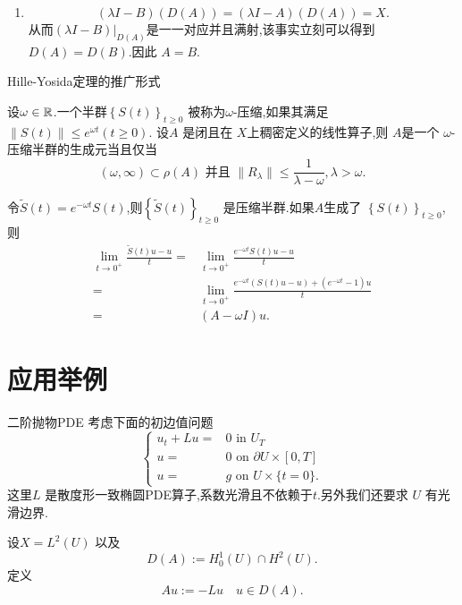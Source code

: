 \begin{frame}[t]
\begin{enumerate}
  \item []\[
      \left( \lambda I-B \right) (D(A))=\left( \lambda I-A \right) \left(D \left( A \right)  \right) =X.
  \] 
  从而$\left( \lambda I-B \right) |_{D(A)}$是一一对应并且满射,该事实立刻可以得到$D(A)=D(B)$.因此 $A=B$.
\end{enumerate}  
\end{frame}

\begin{frame}[t]{Hille-Yosida定理的推广形式}
  \begin{theorem}
    设$\omega \in \mathbb{R}$.一个半群$\left\{S(t)\right\} _{t\ge 0}$ 被称为$\omega$-压缩,如果其满足$\|S(t)\|\le e^{\omega t}(t\ge 0)$. 设$A$ 是闭且在 $X$上稠密定义的线性算子,则 $A$是一个 $\omega$-压缩半群的生成元当且仅当
    \begin{equation}
      (\omega,\infty)\subset \rho(A) \text{ 并且 } \|R_\lambda\|\le \frac{1}{\lambda - \omega},\lambda>\omega.\label{15}
    \end{equation}
  \end{theorem}
  令$\widetilde{S}(t)=e^{-\omega t}S(t)$,则$\left\{\widetilde{S}(t)\right\}_{t\ge 0} $ 是压缩半群.如果$A$生成了 $\left\{S(t)\right\} _{t\ge 0}$,则
  \begin{align*}
  \lim_{t\to 0^{+}}\frac{\widetilde{S}(t)u-u}{t}=&\lim_{t\to 0^{+}} \frac{e^{-\omega t }S(t)u - u}{t} \\
  = & \lim_{t\to 0^{+}} \frac{e^{-\omega t}(S(t)u-u)+(e^{-\omega t}-1)u}{t}\\
  = & (A-\omega I)u
  .\end{align*}
\end{frame}

\section{应用举例}
\begin{frame}[t]{二阶抛物PDE}
  考虑下面的初边值问题
  \begin{equation}
    \left\{
      \begin{aligned}
	u_t+Lu=&0   \text{ in }U_T\\
	u=&0 \text{ on  } \partial U\times [0,T]\\
	u=&g \text{ on }U\times\{t=0\}.
      \end{aligned}
    \right.
  \end{equation}
  这里$L$ 是散度形一致椭圆PDE算子,系数光滑且不依赖于$t$.另外我们还要求 $U$ 有光滑边界.
  
  设$X=L^2(U)$ 以及
  \begin{equation}
    D(A):= H_0^{1}(U)\cap H^2(U).\label{17}
  \end{equation}
  定义
\begin{equation}
  Au:=-Lu \quad u \in D(A).\label{18}
\end{equation}
\end{frame}

